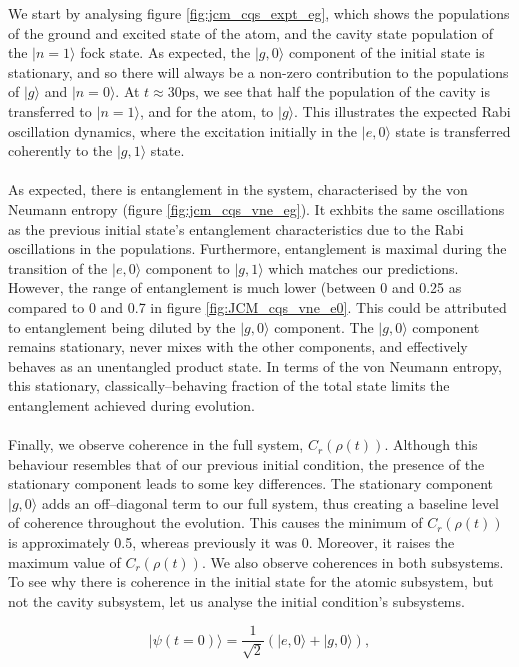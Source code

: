 \documentclass[12pt]{article}
\begin{document}
We start by analysing figure \ref{fig:jcm_cqs_expt_eg}, which shows the populations of the ground and excited state of the atom, and the cavity state population of the $|n=1\rangle$ fock state. As expected, the $|g,0\rangle$ component of the initial state is stationary, and so there will always be a non-zero contribution to the populations of $|g\rangle$ and $|n=0\rangle$. At $t\approx 30\text{ps}$, we see that half the population of the cavity is transferred to $|n=1\rangle$, and for the atom, to $|g\rangle$. This illustrates the expected Rabi oscillation dynamics, where the excitation initially in the $|e,0\rangle$ state is transferred coherently to the $|g,1\rangle$ state. \\
\\
As expected, there is entanglement in the system, characterised by the von Neumann entropy (figure \ref{fig:jcm_cqs_vne_eg}). It exhbits the same oscillations as the previous initial state's entanglement characteristics due to the Rabi oscillations in the populations. Furthermore, entanglement is maximal during the transition of the $|e,0\rangle$ component to $|g,1\rangle$ which matches our predictions. However, the range of entanglement is much lower (between 0 and 0.25 as compared to 0 and 0.7 in figure \ref{fig:JCM_cqs_vne_e0}. This could be attributed to entanglement being diluted by the $|g,0\rangle$ component. The $|g,0\rangle$ component remains stationary, never mixes with the other components, and effectively behaves as an unentangled product state.
In terms of the von Neumann entropy, this stationary, classically--behaving fraction of the total state limits the entanglement achieved during evolution.\\
\\
Finally, we observe coherence in the full system, $C_r(\rho(t))$. Although this behaviour resembles that of our previous initial condition,  the presence of the stationary component leads to some key differences. The stationary component $|g,0\rangle$ adds an off--diagonal term to our full system, thus creating a baseline level of coherence throughout the evolution. This causes the minimum of $C_r(\rho(t))$ is approximately 0.5, whereas previously it was 0. Moreover, it raises the maximum value of $C_r(\rho(t))$. We also observe coherences in both subsystems. To see why there is coherence in the initial state for the atomic subsystem, but not the cavity subsystem, let us analyse the initial condition's subsystems.

\begin{equation*}
    |\psi(t=0)\rangle = \frac{1}{\sqrt{2}}\left(|e,0\rangle + |g,0\rangle\right),
\end{equation*}
\end{document}
